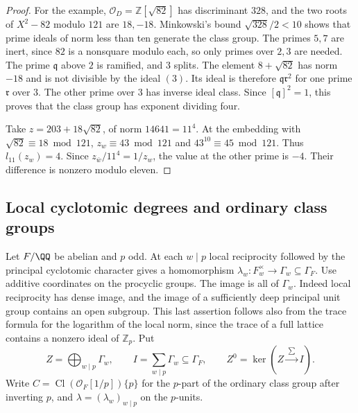 \documentclass[a4paper,11pt]{article}
\theoremstyle{definition}
\theoremstyle{remark}
\newcommand{\ZZ}{\mathbb Z}\newcommand{\ord}{\operatorname{ord}}
\numberwithin{equation}{section}
\newcommand{\Cl}{\operatorname{Cl}}
\newcommand{\OO}{\mathcal O}
\begin{document}
\begin{proof}
For the example, \(\OO_D=\ZZ[\sqrt{82}]\) has discriminant
\(328\), and the two roots of \(X^2-82\) modulo \(121\)
are \(18,-18\). Minkowski's bound \(\sqrt{328}/2<10\)
shows that prime ideals of norm less than ten generate the
class group. The primes \(5,7\) are inert, since \(82\) is a
nonsquare modulo each, so only primes over \(2,3\) are needed.
The prime \(\mathfrak q\) above \(2\) is ramified,
and \(3\) splits. The element \(8+\sqrt{82}\) has norm
\(-18\) and is not divisible by the ideal \((3)\). Its ideal
is therefore \(\mathfrak q\mathfrak r^2\) for one prime
\(\mathfrak r\) over \(3\). The other prime over \(3\) has
inverse ideal class. Since \([\mathfrak q]^2=1\), this proves
that the class group has exponent dividing four.

Take \(z=203+18\sqrt{82}\), of norm \(14641=11^4\).
At the embedding with \(\sqrt{82}\equiv18\bmod121\),
\(z_w\equiv43\bmod121\) and \(43^{10}\equiv45\bmod121\).
Thus \(l_{11}(z_w)=4\). Since
\(z_{\bar w}/11^4=1/z_w\), the value at the other prime is
\(-4\). Their difference is nonzero modulo eleven.
\end{proof}

\subsection{Local cyclotomic degrees and ordinary class groups}\label{nav:IV-62}
Let \(F/\QQ\) be abelian and \(p\) odd. At each \(w\mid p\)
local reciprocity followed by the principal cyclotomic
character gives a homomorphism
\(\lambda_w:F_w^\times\to\Gamma_w\subseteq\Gamma_F\).
Use additive coordinates on the procyclic groups. The image
is all of \(\Gamma_w\). Indeed local reciprocity has dense
image, and the image of a sufficiently deep principal unit
group contains an open subgroup. This last assertion follows
also from the trace formula for the logarithm of the local
norm, since the trace of a full lattice contains a nonzero
ideal of \(\ZZ_p\). Put
\[
 Z=\bigoplus_{w\mid p}\Gamma_w,\qquad
 I=\sum_{w\mid p}\Gamma_w\subseteq\Gamma_F,\qquad
 Z^0=\ker(Z\xrightarrow{\ \sum\ } I).
\]
Write \(C=\Cl(\mathcal O_F[1/p])\{p\}\) for the \(p\)-part
of the ordinary class group after inverting \(p\), and
\(\lambda=(\lambda_w)_{w\mid p}\) on the \(p\)-units.
\end{document}
